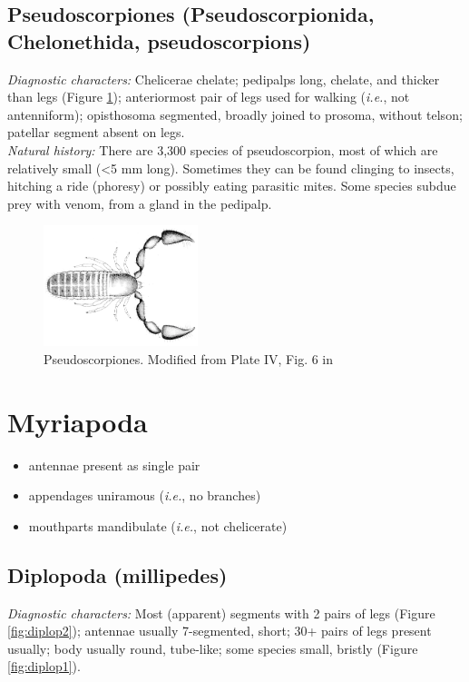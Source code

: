 \documentclass[letterpaper, 11pt]{article}
\begin{document}
\subsection{Pseudoscorpiones (Pseudoscorpionida, Chelonethida, pseudoscorpions)}
\noindent{}\textit{Diagnostic characters:} Chelicerae chelate; pedipalps long, chelate, and thicker than legs (Figure \ref{fig:pseudo}); anteriormost pair of legs used for walking (\textit{i.e.}, not antenniform); opisthosoma segmented, broadly joined to prosoma, without telson; patellar segment absent on legs.\\

\noindent{}\textit{Natural history:} There are 3,300 species of pseudoscorpion, most of which are relatively small (\textless5 mm long). Sometimes they can be found clinging to insects, hitching a ride (phoresy) or possibly eating parasitic mites. Some species subdue prey with venom, from a gland in the pedipalp.\\

\begin{figure}[ht!]
  \centering
    \includegraphics[width=0.4\textwidth]{pseudoscorppl4fig6.png}
  \caption{Pseudoscorpiones. Modified from Plate IV, Fig. 6 in \cite{bhlitem260979pseudo}}
  \label{fig:pseudo}
\end{figure}%

\section{Myriapoda}
\begin{itemize}
\item antennae present as single pair
\item appendages uniramous (\textit{i.e.}, no branches)
\item mouthparts mandibulate (\textit{i.e.}, not chelicerate)
\end{itemize}

\subsection{Diplopoda (millipedes)}
\noindent{}\textit{Diagnostic characters:} Most (apparent) segments with 2 pairs of legs (Figure \ref{fig:diplop2}); antennae usually 7-segmented, short; 30+ pairs of legs present usually; body usually round, tube-like; some species small, bristly (Figure \ref{fig:diplop1}).\\
\end{document}

